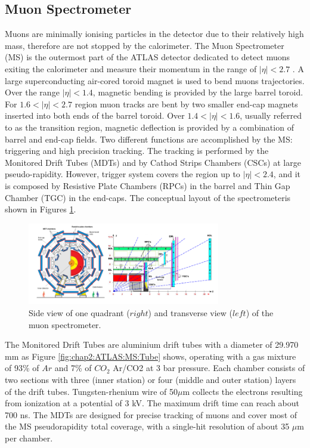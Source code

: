 \subsection{Muon Spectrometer}
\label{chap2:ATLAS:MS}
Muons are minimally ionising particles in the detector due to their relatively high mass, therefore are not stopped by the calorimeter. The Muon Spectrometer (MS) is the outermost part of the ATLAS detector dedicated to detect muons exiting the calorimeter and measure their momentum in the range of $|\eta| < 2.7$ \cite{Muon_TDR}. A large superconducting air-cored toroid magnet is used to bend muons trajectories. Over the range $|\eta| < 1.4$, magnetic bending is provided by the large barrel toroid. For $1.6<|\eta| < 2.7$ region muon tracks are bent by two smaller end-cap magnets inserted into both ends of the barrel toroid. Over $1.4<|\eta|<1.6$, usually referred to as the transition region, magnetic deflection is provided by a combination of barrel and end-cap fields. Two different functions are accomplished by the MS: triggering and high precision tracking. The tracking is performed by the Monitored Drift Tubes (MDTs) and by Cathod Strips Chambers (CSCs) at large pseudo-rapidity. However, trigger system covers the region up to $|\eta| < 2.4$, and it is composed by Resistive Plate Chambers (RPCs) in the barrel and Thin Gap Chamber (TGC) in the end-caps. The conceptual layout of the spectrometeris shown in Figures \ref{fig:chap2:ATLAS:MS}. \\
\begin{figure}[htbp]
    \centering
    \includegraphics[width=0.75\textwidth]{Ch2/Img/Muon.png}
    \caption{Side view of one quadrant ($right$) and transverse view ($left$) of the muon spectrometer.}
    \label{fig:chap2:ATLAS:MS}
\end{figure}
The Monitored Drift Tubes are aluminium drift tubes with a diameter of 29.970 mm as Figure \ref{fig:chap2:ATLAS:MS:Tube} shows, operating with a gas mixture of 93\% of $Ar$ and 7\% of $CO_2$ Ar/CO2 at 3 bar pressure. Each chamber consists of two sections with three (inner station) or four (middle and outer station) layers of the drift tubes. Tungsten-rhenium wire of 50$\mu$m collects the electrons resulting from ionization at a potential of 3 kV. The maximum drift time can reach about 700 ns. The MDTs are designed for precise tracking of muons and cover most of the MS pseudorapidity total coverage, with a single-hit resolution of about 35 $\mu$m per chamber. \\
